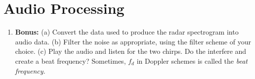 \documentclass{article}
\begin{document}
\section{Audio Processing}

\begin{enumerate}
\item \textbf{Bonus:} (a) Convert the data used to produce the radar spectrogram into audio data. (b) Filter the noise as appropriate, using the filter scheme of your choice. (c) Play the audio and listen for the two chirps.  Do the interfere and create a beat frequency?  Sometimes, $f_d$ in Doppler schemes is called the \textit{beat frequency.}
\end{enumerate}
\end{document}

